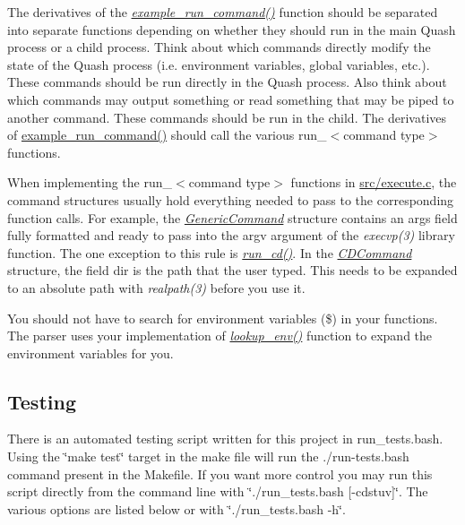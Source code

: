 The derivatives of the {\itshape \hyperlink{execute_8c_a75b252ab1292f5947f2bcd0454f6378b}{example\+\_\+run\+\_\+command()}} function should be separated into separate functions depending on whether they should run in the main Quash process or a child process. Think about which commands directly modify the state of the Quash process (i.\+e. environment variables, global variables, etc.). These commands should be run directly in the Quash process. Also think about which commands may output something or read something that may be piped to another command. These commands should be run in the child. The derivatives of \hyperlink{execute_8c_a75b252ab1292f5947f2bcd0454f6378b}{example\+\_\+run\+\_\+command()} should call the various run\+\_\+$<$command type$>$ functions.

When implementing the run\+\_\+$<$command type$>$ functions in \hyperlink{execute_8c}{src/execute.\+c}, the command structures usually hold everything needed to pass to the corresponding function calls. For example, the {\itshape \hyperlink{structGenericCommand}{Generic\+Command}} structure contains an args field fully formatted and ready to pass into the argv argument of the {\itshape execvp(3)} library function. The one exception to this rule is {\itshape \hyperlink{execute_8c_a8e9aed155e5ccf7e207a8f3ce4789d83}{run\+\_\+cd()}}. In the {\itshape \hyperlink{structCDCommand}{C\+D\+Command}} structure, the field dir is the path that the user typed. This needs to be expanded to an absolute path with {\itshape realpath(3)} before you use it.

You should not have to search for environment variables (\$) in your functions. The parser uses your implementation of {\itshape \hyperlink{execute_8c_afeab372587374ba444aa9bdfb6cfa0d8}{lookup\+\_\+env()}} function to expand the environment variables for you.

\subsection*{Testing}

There is an automated testing script written for this project in run\+\_\+tests.\+bash. Using the \char`\"{}make test\char`\"{} target in the make file will run the ./run-\/tests.bash command present in the Makefile. If you want more control you may run this script directly from the command line with \char`\"{}./run\+\_\+tests.\+bash \mbox{[}-\/cdstuv\mbox{]}\char`\"{}. The various options are listed below or with \char`\"{}./run\+\_\+tests.\+bash -\/h\char`\"{}.


